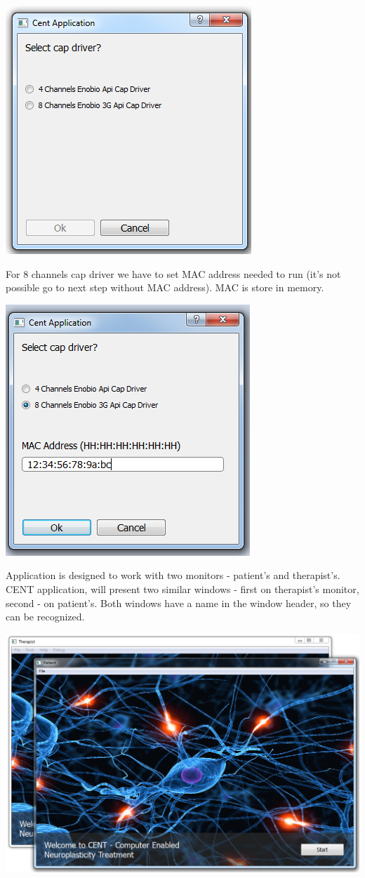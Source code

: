 \documentclass[letterpaper,10pt,english]{sphinxmanual}
\begin{document}
{\hfill\includegraphics{SelectCapDriver.PNG}\hfill}

For 8 channels cap driver we have to set MAC address needed to run (it's not possible go to next step without MAC address). MAC is store in memory.

{\hfill\includegraphics{SelectCapDriverWithMAC.PNG}\hfill}

Application is designed to work with two monitors - patient's and therapist's. CENT application, will present two similar windows - first on therapist's monitor, second - on patient's. Both windows have a name in the window header, so they can be recognized.

{\hfill\includegraphics{WindowsHeaders.PNG}\hfill}
\end{document}
